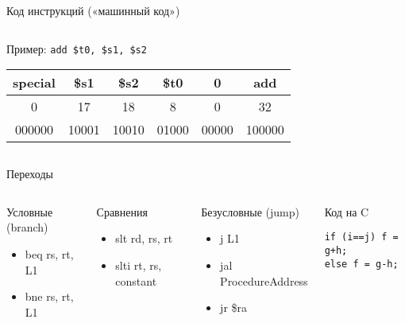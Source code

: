 \begin{frame}{Код инструкций («машинный код»)}
\pause
\begin{columns}
    \column{9.5cm}
\begin{block}{Пример: \texttt{add \$t0, \$s1, \$s2}}
\small
\ttfamily
\begin{tabular}{|c|c|c|c|c|c|}
\hline
special & \$s1 & \$s2 & \$t0 & 0 & add\\
\hline
0 & 17 & 18 & 8 & 0 & 32\\
\hline
000000 & 10001 & 10010 & 01000 & 00000 & 100000\\
\hline
\end{tabular}
\end{block}
    \column{1cm}
\end{columns}


\end{frame}

\begin{frame}[fragile]{Переходы}

\begin{columns}

    \column{5.5cm}
\pause
\begin{block}{\small Условные (branch)}
\begin{itemize}\ttfamily\small
    \item beq rs, rt, L1
    \item bne rs, rt, L1
\end{itemize}
\end{block}

\pause\vspace{-.1cm}
\begin{block}{\small Сравнения}
\begin{itemize}\ttfamily\small
    \item slt rd, rs, rt
    \item slti rt, rs, constant
\end{itemize}
\end{block}

\pause\vspace{-.1cm}
\begin{block}{\small Безусловные (jump)}
\begin{itemize}\ttfamily\small
    \item j L1
    \item jal ProcedureAddress
    \item jr \$ra
\end{itemize}
\end{block}

    \column{5.5cm}
\pause
\begin{block}{Код на C}
\begin{verbatim}if (i==j) f = g+h;
else f = g-h;\end{verbatim}
\end{block}


\end{columns}
\end{frame}
